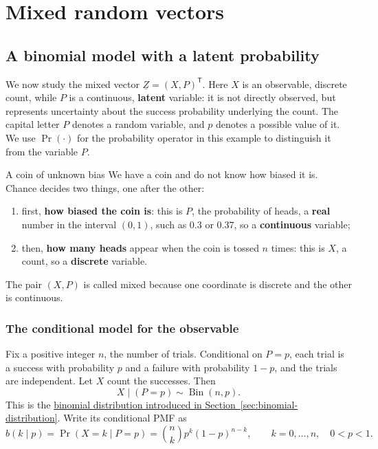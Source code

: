 \documentclass[a4paper,12pt,oneside]{report}
\begin{document}
\section{Mixed random vectors}
\label{sec:mixed-random-vectors}

\subsection{A binomial model with a latent probability}
\label{sec:october-14-exercise-2}

We now study the mixed vector
$\underline{Z}=(X,P)^{\mathsf T}$. Here $X$ is an observable, discrete
count, while $P$ is a continuous, \textbf{latent} variable: it is
not directly observed, but represents uncertainty about the
success probability underlying the count. The capital letter $P$
denotes a random variable, and $p$ denotes a possible value of it.
We use $\Pr(\cdot)$ for the probability operator in this example
to distinguish it from the variable $P$.

\begin{framedexample}{A coin of unknown bias}
We have a coin and do not know how biased it is. Chance decides
two things, one after the other:
\begin{enumerate}
  \item first, \textbf{how biased the coin is}: this is $P$, the
    probability of heads, a \textbf{real} number in the interval
    $(0,1)$, such as $0.3$ or $0.37$, so a \textbf{continuous}
    variable;
  \item then, \textbf{how many heads} appear when the coin is tossed
    $n$ times: this is $X$, a count, so a \textbf{discrete} variable.
\end{enumerate}
The pair $(X,P)$ is called mixed because one coordinate is discrete
and the other is continuous.
\end{framedexample}

\subsubsection{The conditional model for the observable}
Fix a positive integer $n$, the number of trials. Conditional on
$P=p$, each trial is a success with probability $p$ and a failure
with probability $1-p$, and the trials are independent. Let $X$
count the successes. Then
\[
  X\mid(P=p)\sim\operatorname{Bin}(n,p).
\]
This is the \hyperref[sec:binomial-distribution]{binomial distribution
introduced in Section~\ref{sec:binomial-distribution}}.
Write its conditional PMF as
\[
  b(k\mid p)=\Pr(X=k\mid P=p)
     =\binom nk p^k(1-p)^{n-k},
  \qquad k=0,\ldots,n,\quad 0<p<1.
\]
\end{document}
